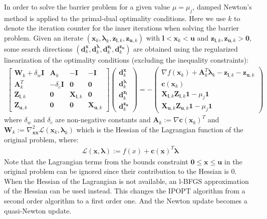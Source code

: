   In order to solve the barrier problem for a given value $\mu = \mu_j$, damped Newton's method is applied to the primal-dual optimality conditions. Here we use $k$ to denote the iteration counter for the inner iterations when solving the barrier problem. Given an iterate $(\bm{x}_k, \bm{\lambda}_k, \bm{z}_{\bm{l}, k}, \bm{z}_{\bm{u}, k})$ with $\bm{l} < \bm{x}_k < \bm{u}$ and  $\bm{z}_{\bm{l}, k}, \bm{z}_{\bm{u}, k} > \bm{0}$, some search directions $(\bm{d}_k^{\bm{x}}, \bm{d}_k^{\bm{\lambda}}, \bm{d}_k^{\bm{z}_{\bm{l}}}, \bm{d}_k^{\bm{z}_{\bm{u}}})$ are obtained using the regularized linearization of the optimality conditions (excluding the inequality constraints):
  \begin{align}
      \begin{bmatrix}
        \bm{W}_k + \delta_w \bm{I} & \bm{A}_k & -\bm{I} & -\bm{I} \\
        \bm{A}_k^T & -\delta_c \bm{I} & \bm{0} & \bm{0} \\
        \bm{Z}_{\bm{l},k} & \bm{0} & \bm{X}_{\bm{l},k} & \bm{0} \\
        \bm{Z}_{\bm{u},k} & \bm{0} & \bm{0} & \bm{X}_{\bm{u}, k}
      \end{bmatrix} \begin{pmatrix}
        \bm{d}_k^{\bm{x}} \\
        \bm{d}_k^{\bm{\lambda}} \\
        \bm{d}_k^{\bm{z}_{\bm{l}}} \\
        \bm{d}_k^{\bm{z}_{\bm{u}}}
      \end{pmatrix} = - \begin{pmatrix}
        \nabla f(\bm{x}_k) + \bm{A}_k^T \bm{\lambda}_k - \bm{z}_{\bm{l}, k} - \bm{z}_{\bm{u}, k}  \\
        \bm{c}(\bm{x}_k) \\
        \bm{X}_{\bm{l}, k} \bm{Z}_{\bm{l}, k} \bm{1} - \mu_j \bm{1} \\
        \bm{X}_{\bm{u}, k} \bm{Z}_{\bm{u}, k} \bm{1} - \mu_j \bm{1}
      \end{pmatrix}
  \end{align}
  where $\delta_w$ and $\delta_c$ are non-negative constants and $\bm{A}_k := \nabla \bm{c}(\bm{x}_k)^T$ and $\bm{W}_k := \nabla^2_{\bm{x}\bm{x}} \mathcal{L}(\bm{x}_k, \bm{\lambda}_k)$ which is the Hessian of the Lagrangian function of the original problem, where:
  \begin{align}
    \mathcal{L}(\bm{x}, \bm{\lambda}) := f(x) + \bm{c}(\bm{x})^T \bm{\lambda}
  \end{align}
  Note that the Lagrangian terms from the bounds constraint $\bm{0} \leq \bm{x} \leq \bm{u}$ in the original problem can be ignored since their contribution to the Hessian is 0. When the Hessian of the Lagrangian is not available, an l-BFGS approximation \citep{Nocedal2006} of the Hessian can be used instead. This changes the IPOPT algorithm from a second order algorithm to a first order one. And the Newton update becomes a quasi-Newton update.
  
